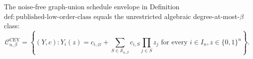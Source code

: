 The noise-free graph-union schedule envelope in Definition~\(\mathrm{def{:}published\text{-}low\text{-}order\text{-}class}\) equals the unrestricted algebraic degree-at-most-\(\beta\) class:
\[
\mathcal C^{\mathrm{CEY}}_{n,\beta}
=\left\{(Y,c):Y_i(z)=c_{i,\varnothing}+
\sum_{S\in\mathcal S_{n,\beta}}c_{i,S}\prod_{j\in S}z_j
\text{ for every }i\in I_n, z\in\{0,1\}^n\right\}.
\]